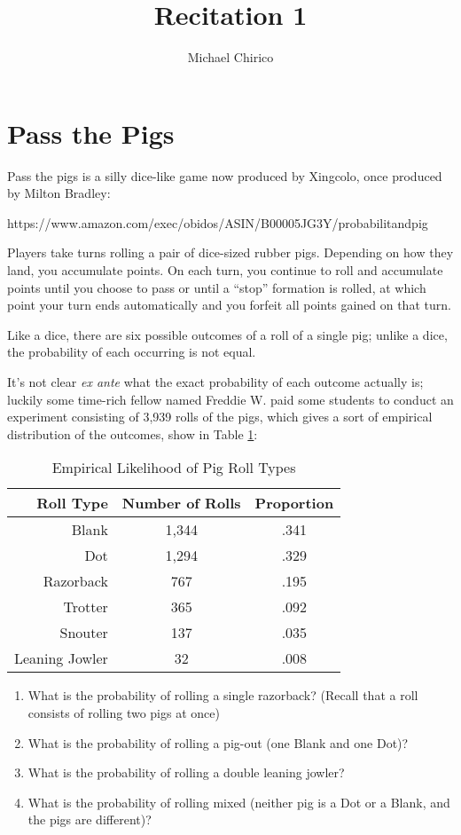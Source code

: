 \documentclass{article}
\begin{document}
\title{Recitation 1}
\author{Michael Chirico}

\maketitle

\section{Pass the Pigs}

Pass the pigs is a silly dice-like game now produced by Xingcolo, once produced by Milton Bradley:

https://www.amazon.com/exec/obidos/ASIN/B00005JG3Y/probabilitandpig

Players take turns rolling a pair of dice-sized rubber pigs. Depending on how they land, you accumulate points. On each turn, you continue to roll and accumulate points until you choose to pass or until a ``stop'' formation is rolled, at which point your turn ends automatically and you forfeit all points gained on that turn. 

Like a dice, there are six possible outcomes of a roll of a single pig; unlike a dice, the probability of each occurring is not equal.

It's not clear \textit{ex ante} what the exact probability of each outcome actually is; luckily some time-rich fellow named Freddie W. paid some students to conduct an experiment consisting of 3,939 rolls of the pigs, which gives a sort of empirical distribution of the outcomes, show in Table \ref{tbl:pigout}:

\begin{table}[htbp]
\centering
\begin{tabular}{|r|c|c|}
\hline
Roll Type & Number of Rolls & Proportion \\
\hline
Blank & 1,344 & .341 \\
\hline
Dot & 1,294 & .329 \\
\hline
Razorback & 767 & .195 \\
\hline
Trotter & 365 & .092 \\
\hline
Snouter & 137 & .035 \\
\hline
Leaning Jowler & 32 & .008 \\
\hline
\end{tabular}
\caption{Empirical Likelihood of Pig Roll Types}
\label{tbl:pigout}
\end{table}

\begin{enumerate}
\item What is the probability of rolling a single razorback? (Recall that a roll consists of rolling two pigs at once)
\item What is the probability of rolling a pig-out (one Blank and one Dot)?
\item What is the probability of rolling a double leaning jowler?
\item What is the probability of rolling mixed (neither pig is a Dot or a Blank, and the pigs are different)?
\end{enumerate}
\end{document}
